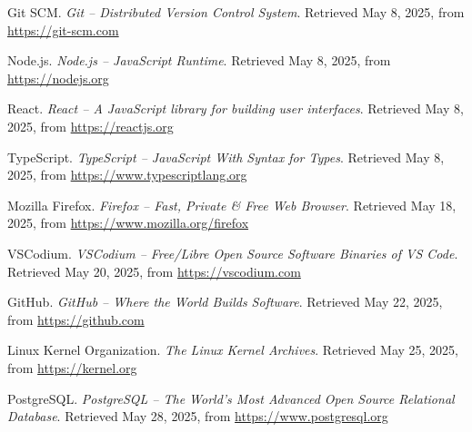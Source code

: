 \begin{thebibliography}{99}
    Git SCM. \textit{Git – Distributed Version Control System}. Retrieved May 8, 2025, from \url{https://git-scm.com}

    Node.js. \textit{Node.js – JavaScript Runtime}. Retrieved May 8, 2025, from \url{https://nodejs.org}

    React. \textit{React – A JavaScript library for building user interfaces}. Retrieved May 8, 2025, from \url{https://reactjs.org}

    TypeScript. \textit{TypeScript – JavaScript With Syntax for Types}. Retrieved May 8, 2025, from \url{https://www.typescriptlang.org}
    
    Mozilla Firefox. \textit{Firefox – Fast, Private \& Free Web Browser}. Retrieved May 18, 2025, from \url{https://www.mozilla.org/firefox}
    
    VSCodium. \textit{VSCodium – Free/Libre Open Source Software Binaries of VS Code}. Retrieved May 20, 2025, from \url{https://vscodium.com}

    GitHub. \textit{GitHub – Where the World Builds Software}. Retrieved May 22, 2025, from \url{https://github.com}

    Linux Kernel Organization. \textit{The Linux Kernel Archives}. Retrieved May 25, 2025, from \url{https://kernel.org}

    PostgreSQL. \textit{PostgreSQL – The World's Most Advanced Open Source Relational Database}. Retrieved May 28, 2025, from \url{https://www.postgresql.org}
    
\end{thebibliography}